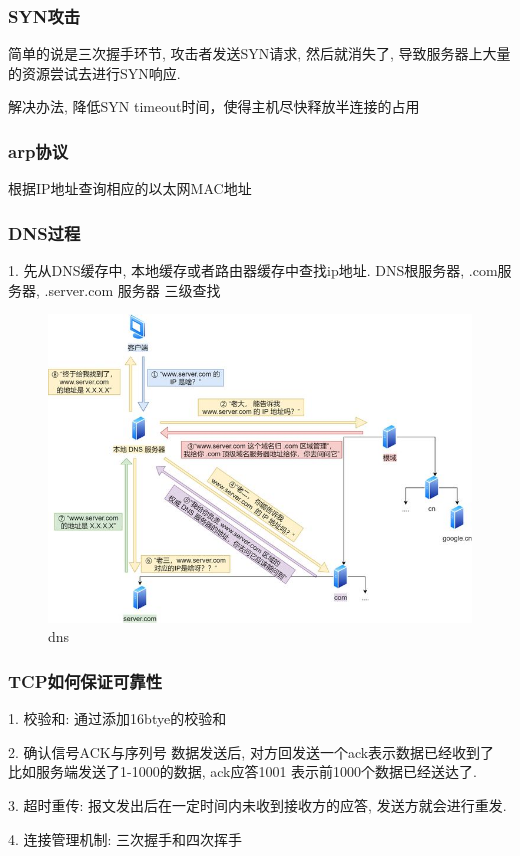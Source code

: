 \documentclass[UTF8]{ctexart}
\begin{document}
\subsubsection{SYN攻击}
简单的说是三次握手环节, 攻击者发送SYN请求, 然后就消失了, 导致服务器上大量的资源尝试去进行SYN响应.

解决办法, 降低SYN timeout时间，使得主机尽快释放半连接的占用

\subsubsection{arp协议}
根据IP地址查询相应的以太网MAC地址

\subsubsection{DNS过程}
1. 先从DNS缓存中, 本地缓存或者路由器缓存中查找ip地址. DNS根服务器, .com服务器, .server.com 服务器 三级查找

\begin{figure}
	\centering
	\includegraphics[width=0.7\linewidth]{figures/dns.jpg}
	\caption{dns}
	\label{fig:dns}
\end{figure}



\subsubsection{TCP如何保证可靠性}
1. 校验和: 通过添加16btye的校验和

2. 确认信号ACK与序列号
数据发送后, 对方回发送一个ack表示数据已经收到了 比如服务端发送了1-1000的数据, ack应答1001 表示前1000个数据已经送达了.

3. 超时重传: 报文发出后在一定时间内未收到接收方的应答, 发送方就会进行重发.

4. 连接管理机制: 三次握手和四次挥手
\end{document}
